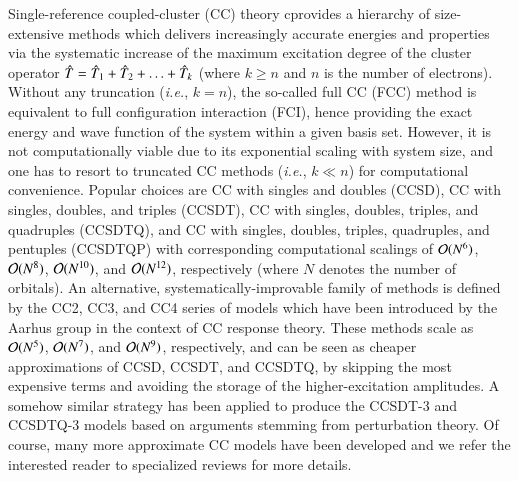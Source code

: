 \documentclass[aip,jcp,reprint,noshowkeys,superscriptaddress]{revtex4-1}
\newcommand{\ie}{\textit{i.e.}}
\newcommand{\hT}{\Hat{T}}
\begin{document}
Single-reference coupled-cluster (CC) theory cprovides a hierarchy of size-extensive methods which delivers increasingly accurate energies and properties via the systematic increase of the maximum excitation degree of the cluster operator $\hT = \hT_1 + \hT_2 + \ldots + \hT_k$ (where $k \ge n$ and $n$ is the number of electrons). \cite{Cizek_1966,Paldus_1972,Crawford_2000,Bartlett_2007,Shavitt_2009}
Without any truncation (\ie, $k = n$), the so-called full CC (FCC) method is equivalent to full configuration interaction (FCI), hence providing the exact energy and wave function of the system within a given basis set.
However, it is not computationally viable due to its exponential scaling with system size, and one has to resort to truncated CC methods  (\ie, $k \ll n$) for computational convenience.
Popular choices are CC with singles and doubles (CCSD), \cite{Cizek_1966,Purvis_1982} CC with singles, doubles, and triples (CCSDT), \cite{Noga_1987a,Scuseria_1988} CC with singles, doubles, triples, and quadruples (CCSDTQ), \cite{Oliphant_1991,Kucharski_1992} and 
CC with singles, doubles, triples, quadruples, and pentuples (CCSDTQP) \cite{Hirata_2000,Kallay_2001} with corresponding computational scalings of $\order*{N^{6}}$, $\order*{N^{8}}$,  $\order*{N^{10}}$, and  $\order*{N^{12}}$, respectively (where $N$ denotes the number of orbitals).
An alternative, systematically-improvable family of methods is defined by the CC2, \cite{Christiansen_1995a} CC3, \cite{Christiansen_1995b,Koch_1997} and CC4 \cite{Kallay_2005} series of models which have been introduced by the Aarhus group in the context of CC response theory. \cite{Christiansen_1998}
These methods scale as $\order*{N^{5}}$, $\order*{N^{7}}$, and $\order*{N^{9}}$, respectively, and can be seen as cheaper approximations of CCSD, CCSDT, and CCSDTQ, by skipping the most expensive terms and avoiding the storage of the higher-excitation amplitudes.
A somehow similar strategy has been applied to produce the CCSDT-3 \cite{Urban_1985,Noga_1987b} and CCSDTQ-3 \cite{Kallay_2005} models based on arguments stemming from perturbation theory.
Of course, many more approximate CC models have been developed and we refer the interested reader to specialized reviews for more details. \cite{Crawford_2000,Bartlett_2007,Shavitt_2009}
\end{document}
